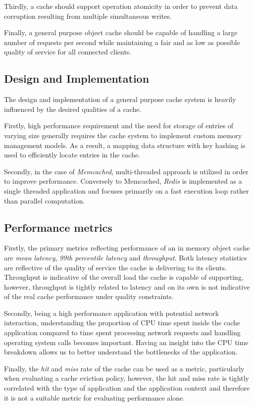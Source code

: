 Thirdly, a cache should support operation atomicity in order to prevent data corruption resulting from multiple simultaneous writes.

Finally, a general purpose object cache should be capable of handling a large number of requests per second while maintaining a fair and as low as possible quality of service for all connected clients.


\subsection{Design and Implementation}
The design and implementation of a general purpose cache system is heavily influenced by the desired qualities of a cache.

Firstly, high performance requirement and the need for storage of entries of varying size generally requires the cache system to implement custom memory management models. As a result, a mapping data structure  with key hashing is used to efficiently locate entries in the cache.

Secondly, in the case of \textit{Memcached}, multi-threaded approach is utilized in order to improve performance. Conversely to Memcached, \textit{Redis} is implemented as a single threaded application and focuses primarily on a fast execution loop rather than parallel computation.


\subsection{Performance metrics}
Firstly, the primary metrics reflecting performance of an in memory object cache are \textit{mean latency}, \textit{99th percentile latency} and \textit{throughput}. Both latency statistics are reflective of the quality of service the cache is delivering to its clients. Throughput is indicative of the overall load the cache is capable of supporting, however, throughput is tightly related to latency and on its own is not indicative of the real cache performance under quality constraints.

Secondly, being a high performance application with potential network interaction, understanding the proportion of CPU time spent inside the cache application compared to time spent processing network requests and handling operating system calls becomes important. Having an insight into the CPU time breakdown allows us to better understand the bottlenecks of the application.

Finally, the \textit{hit} and \textit{miss} rate of the cache can be used as a metric, particularly when evaluating a cache eviction policy, however, the hit and miss rate is tightly correlated with the type of application and the application context and therefore it is not a suitable metric for evaluating performance alone.


